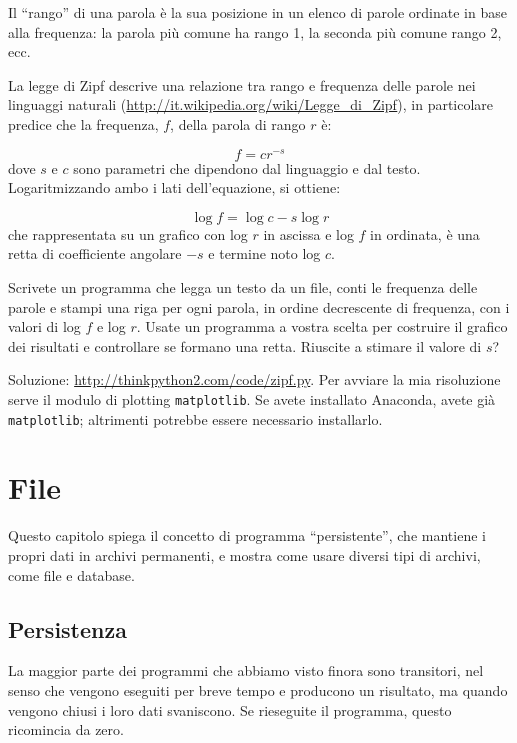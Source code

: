 \documentclass[10pt]{book}
\begin{document}
\begin{exercise}

Il ``rango'' di una parola è la sua posizione in un elenco di parole ordinate in base alla frequenza: la parola più comune ha rango 1, la seconda più comune rango 2, ecc.

La legge di Zipf descrive una relazione tra rango e frequenza delle parole nei linguaggi naturali
(\url{http://it.wikipedia.org/wiki/Legge_di_Zipf}), in particolare predice che la frequenza, $f$, della parola di rango $r$ è:

\[ f = c r^{-s} \]
%
dove $s$ e $c$ sono parametri che dipendono dal linguaggio e dal testo. Logaritmizzando ambo i lati dell'equazione, si ottiene:

\[ \log f = \log c - s \log r \]
%
che rappresentata su un grafico con log $r$ in ascissa e log $f$ in ordinata, è una retta di coefficiente angolare $-s$ e termine noto log $c$.

Scrivete un programma che legga un testo da un file, conti le frequenza delle parole e stampi una riga per ogni parola, in ordine decrescente di frequenza, con i valori di log $f$ e log $r$.  Usate un programma a vostra scelta per costruire il grafico dei risultati e controllare se formano una retta. Riuscite a stimare il valore di $s$?

Soluzione: \url{http://thinkpython2.com/code/zipf.py}.  Per avviare la mia risoluzione serve il modulo di plotting {\tt matplotlib}.
Se avete installato Anaconda, avete già {\tt matplotlib}; altrimenti potrebbe essere necessario installarlo.

\end{exercise}


\chapter{File}

Questo capitolo spiega il concetto di programma ``persistente'', che mantiene i propri dati in archivi permanenti, e mostra come usare diversi tipi di archivi, come file e database.

\section{Persistenza}

La maggior parte dei programmi che abbiamo visto finora sono transitori, nel senso che vengono eseguiti per breve tempo e producono un risultato, ma quando vengono chiusi i loro dati svaniscono. Se rieseguite il programma, questo ricomincia da zero.
\end{document}
